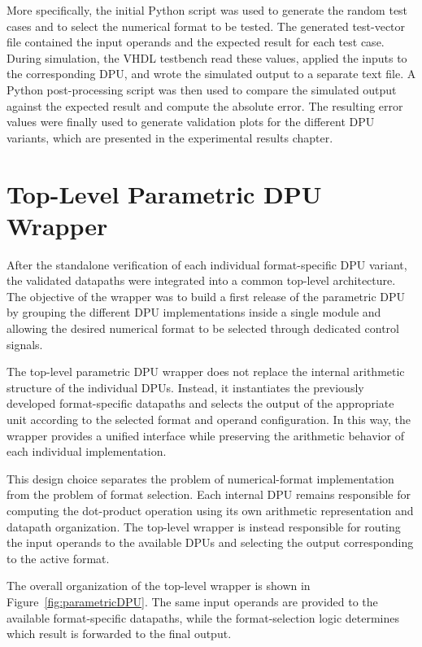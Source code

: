 More specifically, the initial Python script was used to generate the random test cases and to select the numerical format to be tested. The generated test-vector file contained the input operands and the expected result for each test case. During simulation, the VHDL testbench read these values, applied the inputs to the corresponding DPU, and wrote the simulated output to a separate text file. A Python post-processing script was then used to compare the simulated output against the expected result and compute the absolute error. The resulting error values were finally used to generate validation plots for the different DPU variants, which are presented in the experimental results chapter.

\section{Top-Level Parametric DPU Wrapper}

After the standalone verification of each individual format-specific DPU variant, the validated datapaths were integrated into a common top-level architecture. The objective of the wrapper was to build a first release of the parametric DPU by grouping the different DPU implementations inside a single module and allowing the desired numerical format to be selected through dedicated control signals.

The top-level parametric DPU wrapper does not replace the internal arithmetic structure of the individual DPUs. Instead, it instantiates the previously developed format-specific datapaths and selects the output of the appropriate unit according to the selected format and operand configuration. In this way, the wrapper provides a unified interface while preserving the arithmetic behavior of each individual implementation.

This design choice separates the problem of numerical-format implementation from the problem of format selection. Each internal DPU remains responsible for computing the dot-product operation using its own arithmetic representation and datapath organization. The top-level wrapper is instead responsible for routing the input operands to the available DPUs and selecting the output corresponding to the active format.

The overall organization of the top-level wrapper is shown in Figure~\ref{fig:parametricDPU}. The same input operands are provided to the available format-specific datapaths, while the format-selection logic determines which result is forwarded to the final output.


